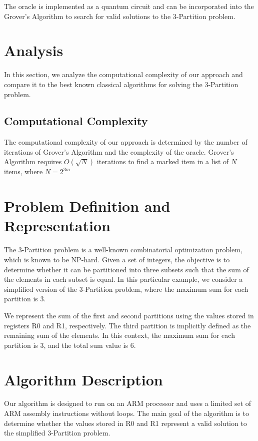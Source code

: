 The oracle is implemented as a quantum circuit and can be incorporated into the Grover's Algorithm to search for valid solutions to the 3-Partition problem.

\section{Analysis}
\label{sec:analysis}

In this section, we analyze the computational complexity of our approach and compare it to the best known classical algorithms for solving the 3-Partition problem.

\subsection{Computational Complexity}

The computational complexity of our approach is determined by the number of iterations of Grover's Algorithm and the complexity of the oracle. Grover's Algorithm requires $O(\sqrt{N})$ iterations to find a marked item in a list of $N$ items, where $N = 2^{3m}$

\section{Problem Definition and Representation}

The 3-Partition problem is a well-known combinatorial optimization problem, which is known to be NP-hard. Given a set of integers, the objective is to determine whether it can be partitioned into three subsets such that the sum of the elements in each subset is equal. In this particular example, we consider a simplified version of the 3-Partition problem, where the maximum sum for each partition is 3.

We represent the sum of the first and second partitions using the values stored in registers R0 and R1, respectively. The third partition is implicitly defined as the remaining sum of the elements. In this context, the maximum sum for each partition is 3, and the total sum value is 6.

\section{Algorithm Description}

Our algorithm is designed to run on an ARM processor and uses a limited set of ARM assembly instructions without loops. The main goal of the algorithm is to determine whether the values stored in R0 and R1 represent a valid solution to the simplified 3-Partition problem. 

